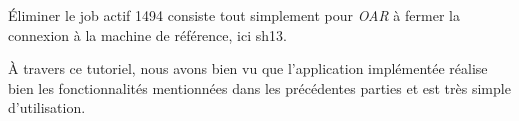 \par Éliminer le job actif 1494 consiste tout simplement pour \emph{OAR} à fermer la connexion à la machine de référence, ici sh13.
\par À travers ce tutoriel, nous avons bien vu que l'application implémentée réalise bien les fonctionnalités mentionnées dans les précédentes parties et est très simple d'utilisation.

